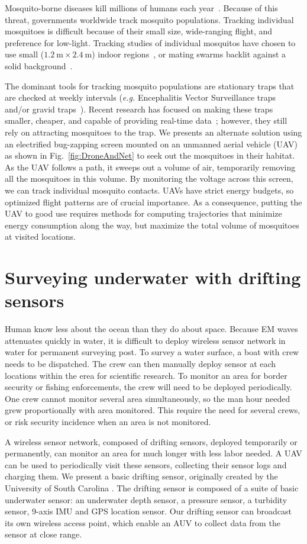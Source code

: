 Mosquito-borne diseases kill millions of humans each year~\cite{murray2012global}. 
Because of this threat, governments worldwide track mosquito populations.
Tracking individual mosquitoes is difficult because of their small size, wide-ranging flight, and preference for low-light.
Tracking studies of individual mosquitos have chosen to use small ($\SI{1.2}{\metre} \times \SI{2.4}{\metre}$) indoor regions~\cite{parker2015infrared}, or mating swarms backlit against a solid background~\cite{butail20113d}.

The dominant tools for tracking mosquito populations are stationary traps that are checked at weekly intervals (\textit{e.g.} Encephalitis Vector Surveillance traps and/or gravid traps~\cite{williams2007comparison}). 
Recent research has focused on making these traps smaller, cheaper, and capable of providing real-time data~\cite{chen2014flying,linn2016building}; however, they still rely on attracting mosquitoes to the trap. 
We presents an alternate solution using an electrified bug-zapping screen mounted on an unmanned aerial vehicle (UAV) as shown in Fig.~\ref{fig:DroneAndNet} to seek out the mosquitoes in their habitat.
As the UAV follows a path, it sweeps out a volume of air, temporarily removing all the mosquitoes in this volume.
By monitoring the voltage across this screen, we can track individual mosquito contacts.
UAVs have strict energy budgets, so optimized flight patterns are of crucial importance.
As a consequence, putting the UAV to good use requires methods for computing trajectories that minimize energy consumption along the way, but maximize the total volume of mosquitoes at visited locations.

\section[Drifting sensors]{Surveying underwater with drifting sensors}

Human know less about the ocean than they do about space.
Because EM waves attenuates quickly in water, it is difficult to deploy wireless sensor network in water for permanent surveying post.
To survey a water surface, a boat with crew needs to be dispatched.
The crew can then manually deploy sensor at each locations within the erea for scientific research.
To monitor an area for border security or fishing enforcements, the crew will need to be deployed periodically.
One crew cannot monitor several area simultaneously, so the man hour needed grew proportionally with area monitored.
This require the need for several crews, or risk security incidence when an area is not monitored.

A wireless sensor network, composed of drifting sensors, deployed temporarily or permanently, can monitor an area for much longer with less labor needed.
A UAV can be used to periodically visit these sensors, collecting their sensor logs and charging them.
We present a basic drifting sensor, originally created by the University of South Carolina \cite{drifterUSC}.
The drifting sensor is composed of a suite of basic underwater sensor: an underwater depth sensor, a pressure sensor, a turbidity sensor, 9-axis IMU and GPS location sensor.
Our drifting sensor can broadcast its own wireless access point, which enable an AUV to collect data from the sensor at close range.
